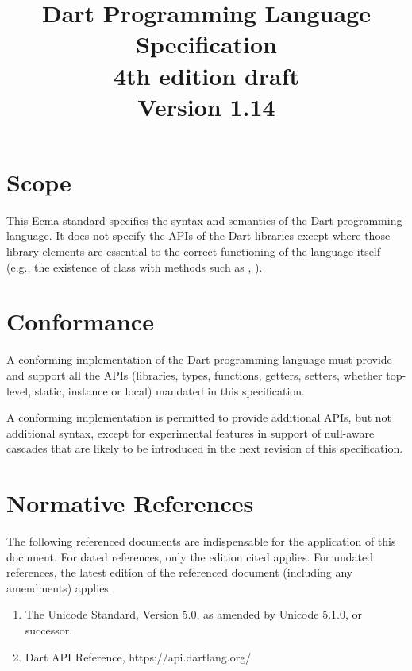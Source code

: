 \documentclass{article}
\title{Dart Programming Language  Specification  \\
{4th edition draft}\\
{\large Version 1.14}}
\begin{document}
\maketitle
\tableofcontents


\newpage

\pagestyle{myheadings}

\section{Scope}

\LMHash{}
This Ecma standard specifies the syntax and semantics of the Dart programming language.  It does not specify the APIs of the Dart libraries except where those library elements are essential to the correct functioning of the language itself (e.g., the existence of class  with methods such as , ).

\section{Conformance}

\LMHash{}
A conforming  implementation of the Dart programming language must provide and support all the  APIs (libraries, types, functions, getters, setters, whether top-level, static, instance or local) mandated in this specification.

\LMHash{}
A conforming implementation is permitted to provide additional APIs, but not additional syntax, except for experimental features in support of null-aware cascades that are likely to be introduced in the next revision of this specification.

\section{Normative References}

\LMHash{}
The following referenced documents are indispensable for the application of this document. For dated references, only the edition cited applies. For undated references, the latest edition of the referenced document (including any amendments) applies.

\begin{enumerate}
\item
The Unicode Standard, Version 5.0, as amended by Unicode 5.1.0, or successor.
\item
Dart API Reference, https://api.dartlang.org/
\end{enumerate}
\end{document}
